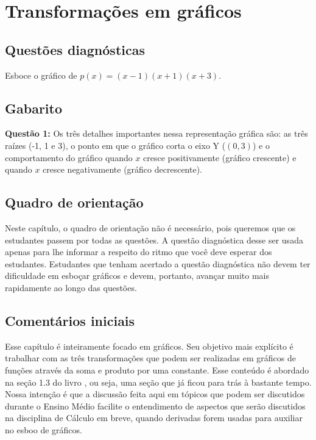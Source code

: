 \documentclass[main_estudante.tex]{subfiles}
\begin{document}
\chapter{Transformações em gráficos}

\section{Questões diagnósticas}

\begin{diagnostico}
Esboce o gráfico de $p(x)=(x-1)(x+1)(x+3)$.
\end{diagnostico}

\section{Gabarito}

\textbf{Questão 1:} Os três detalhes importantes nessa representação gráfica são: as três raízes (-1, 1 e 3), o ponto em que o gráfico corta o eixo Y ($(0,3)$) e o comportamento do gráfico quando $x$ cresce positivamente (gráfico crescente) e quando $x$ cresce negativamente (gráfico decrescente).

\section{Quadro de orientação}

Neste capítulo, o quadro de orientação não é necessário, pois queremos que os estudantes passem por todas as questões. A questão diagnóstica desse ser usada apenas para lhe informar a respeito do ritmo que você deve esperar dos estudantes. Estudantes que tenham acertado a questão diagnóstica não devem ter dificuldade em esboçar gráficos e devem, portanto, avançar muito mais rapidamente ao longo das questões.

\section{Comentários iniciais}

Esse capítulo é inteiramente focado em gráficos. Seu objetivo mais explícito é trabalhar com as três transformações que podem ser realizadas em gráficos de funções através da soma e produto por uma constante. Esse conteúdo é abordado na seção 1.3 do livro , ou seja, uma seção que já ficou para trás à bastante tempo. Nossa intenção é que a discussão feita aqui em tópicos que podem ser discutidos durante o Ensino Médio facilite o entendimento de aspectos que serão discutidos na disciplina de Cálculo em breve, quando derivadas forem usadas para auxiliar no esboo de gráficos.
\end{document}
